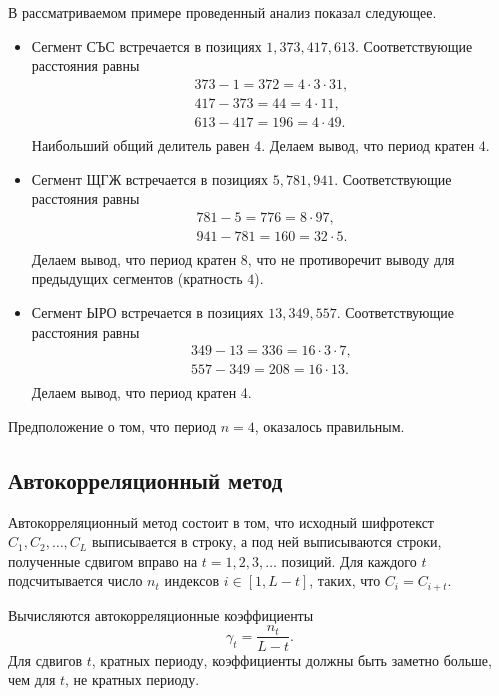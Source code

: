 В рассматриваемом примере проведенный анализ показал следующее.
\begin{itemize}
    \item Сегмент СЪС встречается в позициях $1, 373, 417, 613$. Соответствующие расстояния равны
        \[ \begin{array}{l}
            373 - 1 = 372 = 4 \cdot 3 \cdot 31, \\
            417 - 373= 44 = 4 \cdot 11, \\
            613 - 417 = 196 = 4 \cdot 49. \\
        \end{array} \]
        Наибольший общий делитель равен $4$. Делаем вывод, что период кратен $4$.
    \item Сегмент ЩГЖ встречается в позициях $5, 781, 941$. Соответствующие расстояния равны
        \[ \begin{array}{l}
            781 - 5 = 776 = 8 \cdot 97, \\
            941 - 781 = 160 = 32 \cdot 5. \\
        \end{array} \]
        Делаем вывод, что период кратен $8$, что не противоречит выводу для предыдущих сегментов (кратность $4$).
    \item Сегмент ЫРО встречается в позициях $13, 349, 557$. Соответствующие расстояния равны
        \[ \begin{array}{l}
            349 - 13 = 336 = 16 \cdot 3 \cdot 7, \\
            557 - 349 = 208 = 16 \cdot 13. \\
        \end{array} \]
        Делаем вывод, что период кратен 4.
\end{itemize}

Предположение о том, что период $n=4$, оказалось правильным.
\exampleend


\subsection{Автокорреляционный метод}

Автокорреляционный метод состоит в том, что исходный шифротекст $C_{1},C_{2},  \ldots, C_{L}$ выписывается в строку, а под ней выписываются строки, полученные сдвигом вправо на $t =1, 2, 3, \ldots$ позиций. Для каждого $t$ подсчитывается число  $n_{t}$ индексов $i \in \left[ {1,L - t} \right]$, таких, что $C_i  = C_{i + t}$.

Вычисляются автокорреляционные коэффициенты
    \[ \gamma_t  = \frac{n_t}{L - t}. \]
Для сдвигов $t$, кратных периоду, коэффициенты должны быть заметно больше, чем для $t$, не кратных периоду.

